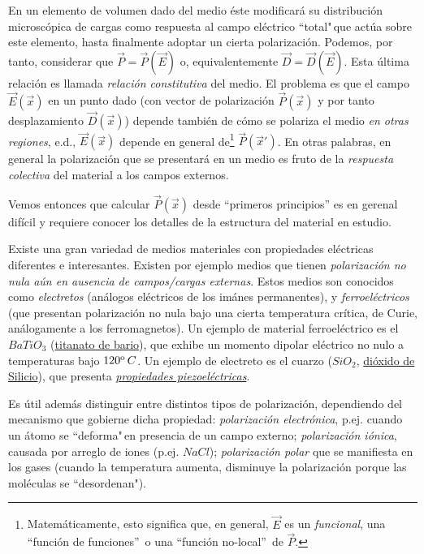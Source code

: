En un elemento de volumen dado del medio éste modificará su distribución microscópica de cargas como respuesta al campo eléctrico ``total"\,que actúa sobre este elemento, hasta finalmente adoptar un cierta polarización. Podemos, por tanto, considerar que $\vec{P}=\vec{P}(\vec{E})$ o, equivalentemente
$\vec{D}=\vec{D}(\vec{E})$. Esta última relación es llamada
\textit{relación constitutiva} del medio. El problema es que el campo
$\vec{E}(\vec{x})$ en un punto dado (con vector de polarización $\vec{P}(\vec{x})$ y
por tanto desplazamiento $\vec{D}(\vec{x})$) depende también de cómo se
polariza el medio \textit{en otras regiones}, e.d., $\vec{E}(\vec{x})$ depende
en general de\footnote{Matemáticamente, esto significa que, en
general, $\vec{E}$ es un \textit{funcional}, una ``función de funciones''\, o
una ``función no-local''\, de $\vec{P}$.} $\vec{P}(\vec{x}')$.
En otras palabras, en general la polarización que se presentará en un medio es fruto de la  \textit{respuesta colectiva} del material a los campos externos.

 Vemos entonces que calcular $\vec{P}(\vec{x})$ desde ``primeros principios'' es en gerenal difícil y requiere conocer los detalles de la estructura del material en estudio.

Existe una gran variedad de medios materiales con propiedades eléctricas
diferentes e interesantes. Existen por ejemplo medios que tienen \textit{polarización
no nula aún en ausencia de campos/cargas externas}. Estos medios son conocidos
como \textit{electretos} (análogos eléctricos de los imánes permanentes), y 
\textit{ferroeléctricos} (que presentan polarización no nula bajo una cierta
temperatura crítica, de Curie, análogamente a los ferromagnetos). Un ejemplo
de material ferroeléctrico es el $BaTiO_3$ (\href{https://en.wikipedia.org/wiki/Barium_titanate}{titanato de bario}), que exhibe un momento dipolar eléctrico no nulo a temperaturas bajo $120^{\rm o}\,C$. Un ejemplo de electreto es el cuarzo ($SiO_2$, \href{https://en.wikipedia.org/wiki/Silicon_dioxide}{dióxido de Silicio}), que presenta \href{https://es.wikipedia.org/wiki/Piezoelectricidad}{\textit{propiedades piezoeléctricas}}.

Es útil además distinguir entre distintos tipos de polarización, dependiendo del mecanismo que gobierne dicha propiedad: \textit{polarización electrónica}, p.ej. cuando un átomo se ``deforma"\,en presencia de un campo externo; \textit{polarización iónica}, causada por arreglo de iones (p.ej. $NaCl$); \textit{polarización polar} que se manifiesta en los gases (cuando la
temperatura aumenta, disminuye la polarización porque las moléculas se
``desordenan").


